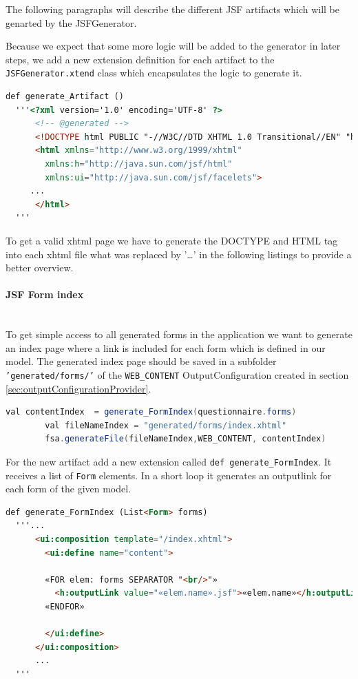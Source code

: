 The following paragraphs will describe the different JSF artifacts which will be
genarted by the JSFGenerator.

Because we expect that some more logic will be added to the generator in later
steps, we add a new extension definition for each artifact to the
\texttt{JSFGenerator.xtend} class which encapsulates the logic to generate it. 

\begin{lstlisting}[language=HTML] 
  def generate_Artifact ()
  '''<?xml version='1.0' encoding='UTF-8' ?>
      <!-- @generated -->
      <!DOCTYPE html PUBLIC "-//W3C//DTD XHTML 1.0 Transitional//EN" "http://www.w3.org/TR/xhtml1/DTD/xhtml1-transitional.dtd">
      <html xmlns="http://www.w3.org/1999/xhtml"
        xmlns:h="http://java.sun.com/jsf/html"
        xmlns:ui="http://java.sun.com/jsf/facelets">
     ...
      </html>
  '''
\end{lstlisting}

To get a valid xhtml page we have to generate the DOCTYPE
and HTML tag into each xhtml file what was replaced by '\ldots' in the following
listings to provide a better overview.

\paragraph{JSF Form index}
$\;$ \\To get simple access to all generated forms in the application
 we want to generate an index page where a link is included for each form which is defined
in our model.
The generated index page should be saved in a subfolder \texttt{'generated/forms/'} of the \texttt{WEB\_CONTENT} OutputConfiguration
created in section \ref{sec:outputConfigurationProvider}.

\begin{lstlisting}[language=Java] 
        val contentIndex  = generate_FormIndex(questionnaire.forms)
        val fileNameIndex = "generated/forms/index.xhtml"
        fsa.generateFile(fileNameIndex,WEB_CONTENT, contentIndex)
\end{lstlisting}

For the new artifact add a new extension called \texttt{def
generate\_FormIndex}.
It receives a list of \texttt{Form} elements. In a short loop it generates an
outputlink for each form of the given model.

\begin{lstlisting}[language=HTML] 
  def generate_FormIndex (List<Form> forms)
  '''...
      <ui:composition template="/index.xhtml">
        <ui:define name="content">
        
        «FOR elem: forms SEPARATOR "<br/>"»
          <h:outputLink value="«elem.name».jsf">«elem.name»</h:outputLink>
        «ENDFOR»
        
        </ui:define>
      </ui:composition>
      ...
  '''
\end{lstlisting}
 
